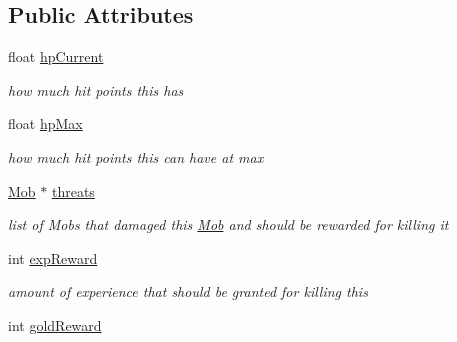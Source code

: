 \subsection*{Public Attributes}
\begin{DoxyCompactItemize}
\item 
float \hyperlink{class_damageable_a74600fde6cf8e5dcd88ddce654500496}{hp\+Current}\hypertarget{class_damageable_a74600fde6cf8e5dcd88ddce654500496}{}\label{class_damageable_a74600fde6cf8e5dcd88ddce654500496}

\begin{DoxyCompactList}\small\item\em how much hit points this has \end{DoxyCompactList}\item 
float \hyperlink{class_damageable_ac40b87477089440eff43ee438daa34d0}{hp\+Max}\hypertarget{class_damageable_ac40b87477089440eff43ee438daa34d0}{}\label{class_damageable_ac40b87477089440eff43ee438daa34d0}

\begin{DoxyCompactList}\small\item\em how much hit points this can have at max \end{DoxyCompactList}\item 
\hyperlink{class_mob}{Mob} $\ast$ \hyperlink{class_damageable_a2d91b79bfd5140c1cc62a2f7b96dd9f7}{threats}\hypertarget{class_damageable_a2d91b79bfd5140c1cc62a2f7b96dd9f7}{}\label{class_damageable_a2d91b79bfd5140c1cc62a2f7b96dd9f7}

\begin{DoxyCompactList}\small\item\em list of Mobs that damaged this \hyperlink{class_mob}{Mob} and should be rewarded for killing it \end{DoxyCompactList}\item 
int \hyperlink{class_damageable_a31f2ef8923b62447291f386807fccbab}{exp\+Reward}\hypertarget{class_damageable_a31f2ef8923b62447291f386807fccbab}{}\label{class_damageable_a31f2ef8923b62447291f386807fccbab}

\begin{DoxyCompactList}\small\item\em amount of experience that should be granted for killing this \end{DoxyCompactList}\item 
int \hyperlink{class_damageable_a29ecf4aca234318222ff32a33826656e}{gold\+Reward}\hypertarget{class_damageable_a29ecf4aca234318222ff32a33826656e}{}\label{class_damageable_a29ecf4aca234318222ff32a33826656e}


\end{DoxyCompactItemize}
